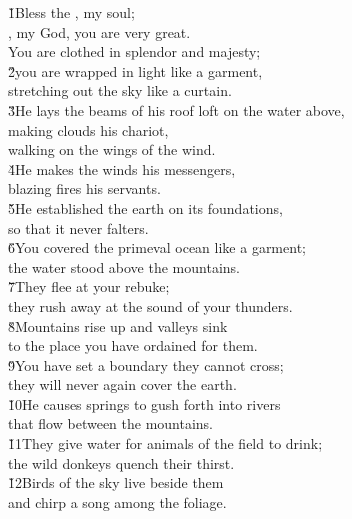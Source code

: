 \begin{poetry}
\poeml \v{1}Bless the , my soul; \\
\poemll    {}, my God, you are very great. \\
\poeml You are clothed in splendor and majesty; \\
\poeml \v{2}you are wrapped in light like a garment, \\
\poemlll       stretching out the sky like a curtain. \\
\poeml \v{3}He lays the beams of his roof loft on the water above, \\
\poemll    making clouds his chariot, \\
\poemlll       walking on the wings of the wind. \\
\poeml \v{4}He makes the winds his messengers, \\
\poemll    blazing fires his servants. \\
\poeml \v{5}He established the earth on its foundations, \\
\poemll    so that it never falters. \\
\poeml \v{6}You covered the primeval ocean like a garment; \\
\poemll    the water stood above the mountains. \\
\poeml \v{7}They flee at your rebuke; \\
\poemll    they rush away at the sound of your thunders. \\
\poeml \v{8}Mountains rise up and valleys sink \\
\poemll    to the place you have ordained for them. \\
\poeml \v{9}You have set a boundary they cannot cross; \\
\poemll    they will never again cover the earth. \\
\poeml \v{10}He causes springs to gush forth into rivers \\
\poemll    that flow between the mountains. \\
\poeml \v{11}They give water for animals of the field to drink; \\
\poemll    the wild donkeys quench their thirst. \\
\poeml \v{12}Birds of the sky live beside them \\
\poemll    and chirp a song among the foliage. \\

\end{poetry}
